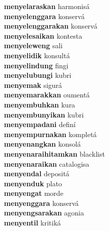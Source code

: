 \textbf{menyelaraskan } harmonisá \\
\textbf{menyelenggara } konservá \\
\textbf{menyelenggarakan } konservá \\
\textbf{menyelesaikan } kontesta \\
\textbf{menyeleweng } sali \\
\textbf{menyelidik } konsultá \\
\textbf{menyelindung } fingi \\
\textbf{menyelubungi } kubri \\
\textbf{menyemak } sigurá \\
\textbf{menyemarakkan } oumentá \\
\textbf{menyembuhkan } kura \\
\textbf{menyembunyikan } kubri \\
\textbf{menyempadani } definí \\
\textbf{menyempurnakan } kompletá \\
\textbf{menyenangkan } konsolá \\
\textbf{menyenaraihitamkan } blacklist \\
\textbf{menyenaraikan } catalogisa \\
\textbf{menyendal } depositá \\
\textbf{menyenduk } plato \\
\textbf{menyengat } morde \\
\textbf{menyenggara } konservá \\
\textbf{menyengsarakan } agonia \\
\textbf{menyentil } kritiká \\
